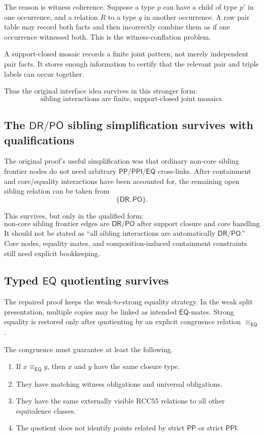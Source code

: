 \documentclass[11pt]{article}
\newcommand{\RCC}{\mathrm{RCC5}}
\newcommand{\PP}{\mathsf{PP}}
\newcommand{\PPI}{\mathsf{PPI}}
\newcommand{\PO}{\mathsf{PO}}
\newcommand{\DR}{\mathsf{DR}}
\newcommand{\EQ}{\mathsf{EQ}}
\newcommand{\eqrel}{\equiv_{\EQ}}
\theoremstyle{definition}
\theoremstyle{plain}
\begin{document}
The reason is witness coherence.  Suppose a type $p$ can have a child of type $p'$ in one occurrence, and a relation $R$ to a type $q$ in another occurrence.  A raw pair table may record both facts and then incorrectly combine them as if one occurrence witnessed both.  This is the witness-conflation problem.

A support-closed mosaic records a finite joint pattern, not merely independent pair facts.  It stores enough information to certify that the relevant pair and triple labels can occur together.

Thus the original interface idea survives in this stronger form:
\[
\boxed{\text{sibling interactions are finite, support-closed joint mosaics.}}
\]

\subsection{The $\DR/\PO$ sibling simplification survives with qualifications}

The original proof's useful simplification was that ordinary non-core sibling frontier nodes do not need arbitrary $\PP/\PPI/\EQ$ cross-links.  After containment and core/equality interactions have been accounted for, the remaining open sibling relation can be taken from
\[
\{\DR,\PO\}.
\]

This survives, but only in the qualified form:
\[
\boxed{\text{non-core sibling frontier edges are }\DR/\PO\text{ after support closure and core handling.}}
\]
It should not be stated as ``all sibling interactions are automatically $\DR/\PO$.''  Core nodes, equality mates, and composition-induced containment constraints still need explicit bookkeeping.

\subsection{Typed $\EQ$ quotienting survives}

The repaired proof keeps the weak-to-strong equality strategy.  In the weak split presentation, multiple copies may be linked as intended $\EQ$-mates.  Strong equality is restored only after quotienting by an explicit congruence relation $\eqrel$.

The congruence must guarantee at least the following.

\begin{enumerate}[leftmargin=2em]
\item If $x\eqrel y$, then $x$ and $y$ have the same closure type.
\item They have matching witness obligations and universal obligations.
\item They have the same externally visible $\RCC5$ relations to all other equivalence classes.
\item The quotient does not identify points related by strict $\PP$ or strict $\PPI$.
\end{enumerate}
\end{document}
